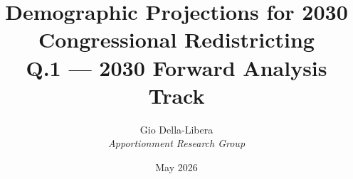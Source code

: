 \documentclass[12pt]{article}
\title{\textbf{Demographic Projections for 2030\\
Congressional Redistricting}\\[0.4em]
\large Q.1 --- 2030 Forward Analysis Track}
\author{Gio Della-Libera \\ \textit{Apportionment Research Group}}
\date{May 2026}
\begin{document}
\maketitle
\begin{abstract}\end{abstract}





\end{document}

